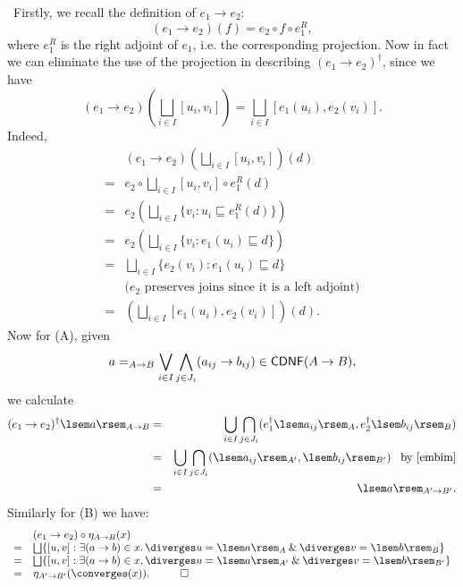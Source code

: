 \proof\ Firstly, we recall the definition of $e_{1} \rightarrow e_{2}$:
\[ (e_{1} \rightarrow e_{2})(f) = e_{2} \circ f \circ e_{1}^{R}, \]
where $e_{1}^{R}$ is the right adjoint of $e_{1}$, i.e. the corresponding projection. Now in fact we can eliminate the use of the projection in describing $(e_{1} \rightarrow e_{2})^{\dag}$, since we have
\[ (e_{1} \rightarrow e_{2})(\bigsqcup_{i \in I}[u_{i}, v_{i}]) = \bigsqcup_{i \in I}[e_{1}(u_{i}), e_{2}(v_{i})]. \]
Indeed,
\[ \begin{array}{cl}
  & (e_{1} \rightarrow e_{2})(\bigsqcup_{i \in I}[u_{i}, v_{i}])(d) \\ 
= & e_{2} \circ \bigsqcup_{i \in I}[u_{i}, v_{i}] \circ e_{1}^{R} (d) \\
= & e_{2}(\bigsqcup_{i \in I}\{ v_{i} : u_{i} \sqsubseteq e_{1}^{R}(d) \}) \\
= & e_{2}(\bigsqcup_{i \in I}\{ v_{i} : e_{1}(u_{i}) \sqsubseteq d \} ) \\
= & \bigsqcup_{i \in I}\{ e_{2}(v_{i}) : e_{1}(u_{i}) \sqsubseteq d \} \\
  & \mbox{($e_{2}$ preserves joins since it is a left adjoint)} \\
= & (\bigsqcup_{i \in I}[e_{1}(u_{i}), e_{2}(v_{i})])(d).
\end{array} \] 
Now for (A), given
\[ a =_{A \rightarrow B} \bigvee_{i \in I} \bigwedge_{j \in J_{i}}(a_{ij} \rightarrow b_{ij}) \in {\sf CDNF}(A \rightarrow B), \]
we calculate
\begin{eqnarray*}
(e_{1} \rightarrow e_{2})^{\dag} \lsem a \rsem_{A \rightarrow B} & = & \bigcup_{i \in I} \bigcap_{j \in J_{i}} (e_{1}^{\dag} \lsem a_{ij} \rsem_{A}, e_{2}^{\dag}\lsem b_{ij} \rsem_{B}) \\
& = & \bigcup_{i \in I} \bigcap_{j \in J_{i}} (\lsem a_{ij} \rsem_{A'}, \lsem b_{ij} \rsem_{B'}) \;\;\; \mbox{by~\ref{embim}} \\
& = & \lsem a \rsem_{A' \rightarrow B'}.
\end{eqnarray*} 
Similarly for (B) we have:
\[ \begin{array}{cl}
  & (e_{1} \rightarrow e_{2}) \circ \eta_{A \rightarrow B}(x) \\ 
= & \bigsqcup \{ [u, v] : \exists (a \rightarrow b) \in x. \, \diverges u = \lsem a \rsem_{A} \: \& \: \diverges v = \lsem b \rsem_{B} \} \\
= & \bigsqcup \{ [u, v] : \exists (a \rightarrow b) \in x. \, \diverges u = \lsem a \rsem_{A'} \: \& \: \diverges v = \lsem b \rsem_{B'} \} \\
= & \eta_{A' \rightarrow B'}( \converges (x)). \;\;\; \qed
\end{array} \] 

